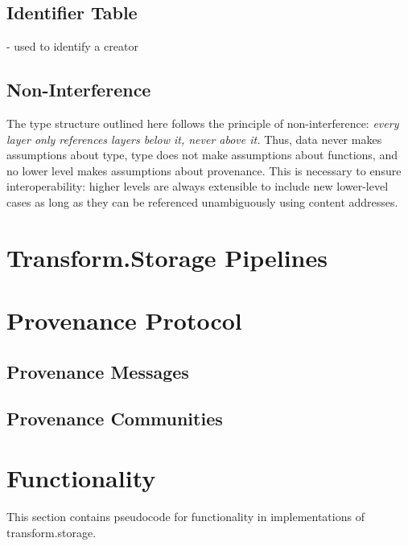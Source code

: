 \documentclass[9pt, oneside]{article}   	%
\begin{document}
\label{execTable}
\setlength{\parindent}{.5 cm}
\begin{multicols}{2}
\vspace{.25 cm}

\subsection{Identifier Table}\label{transformID}
- used to identify a creator

\subsection{Non-Interference}\label{nonInterference}
The type structure outlined here follows the principle of non-interference: \textit{every layer only references layers below it, never above it.} Thus, data never makes assumptions about type, type does not make assumptions about functions, and no lower level makes assumptions about provenance. This is necessary to ensure interoperability: higher levels are always extensible to include new lower-level cases as long as they can be referenced unambiguously using content addresses. 

\section{Transform.Storage Pipelines}\label{transformpipes}

\section{Provenance Protocol}\label{provprotocol}

\subsection{Provenance Messages}\label{provMessages}

\subsection{Provenance Communities}\label{provCommunities}


\end{multicols}
\section{Functionality}\label{pseudocode}

This section contains pseudocode for functionality in implementations of transform.storage.
\end{document}

